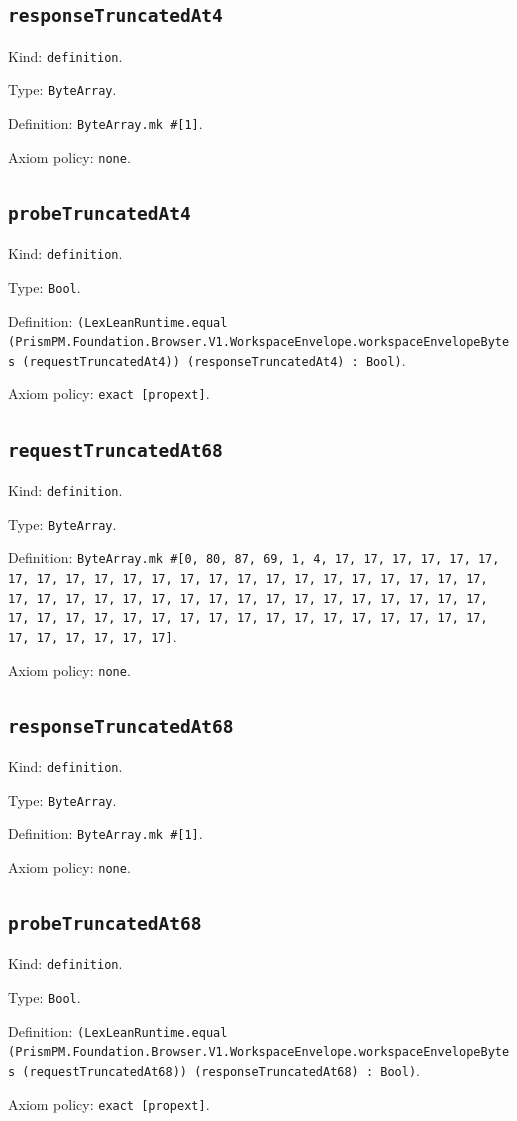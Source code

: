 \documentclass[11pt]{article}
\begin{document}
\subsection*{\texttt{responseTruncatedAt4}}
\noindent Kind: \texttt{definition}.\par
\noindent Type: \texttt{ByteArray}.\par
\noindent Definition: \texttt{ByteArray.mk \#[1]}.\par
\noindent Axiom policy: \texttt{none}.\par
\subsection*{\texttt{probeTruncatedAt4}}
\noindent Kind: \texttt{definition}.\par
\noindent Type: \texttt{Bool}.\par
\noindent Definition: \texttt{(LexLeanRuntime.equal (PrismPM.Foundation.Browser.V1.WorkspaceEnvelope.workspaceEnvelopeBytes (requestTruncatedAt4)) (responseTruncatedAt4) : Bool)}.\par
\noindent Axiom policy: \texttt{exact [propext]}.\par
\subsection*{\texttt{requestTruncatedAt68}}
\noindent Kind: \texttt{definition}.\par
\noindent Type: \texttt{ByteArray}.\par
\noindent Definition: \texttt{ByteArray.mk \#[0, 80, 87, 69, 1, 4, 17, 17, 17, 17, 17, 17, 17, 17, 17, 17, 17, 17, 17, 17, 17, 17, 17, 17, 17, 17, 17, 17, 17, 17, 17, 17, 17, 17, 17, 17, 17, 17, 17, 17, 17, 17, 17, 17, 17, 17, 17, 17, 17, 17, 17, 17, 17, 17, 17, 17, 17, 17, 17, 17, 17, 17, 17, 17, 17, 17, 17, 17, 17]}.\par
\noindent Axiom policy: \texttt{none}.\par
\subsection*{\texttt{responseTruncatedAt68}}
\noindent Kind: \texttt{definition}.\par
\noindent Type: \texttt{ByteArray}.\par
\noindent Definition: \texttt{ByteArray.mk \#[1]}.\par
\noindent Axiom policy: \texttt{none}.\par
\subsection*{\texttt{probeTruncatedAt68}}
\noindent Kind: \texttt{definition}.\par
\noindent Type: \texttt{Bool}.\par
\noindent Definition: \texttt{(LexLeanRuntime.equal (PrismPM.Foundation.Browser.V1.WorkspaceEnvelope.workspaceEnvelopeBytes (requestTruncatedAt68)) (responseTruncatedAt68) : Bool)}.\par
\noindent Axiom policy: \texttt{exact [propext]}.\par
\end{document}
